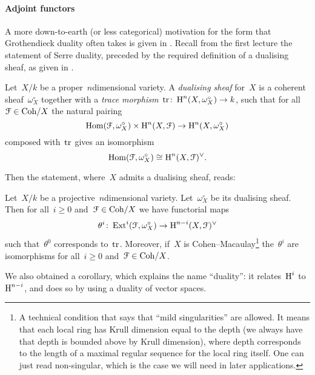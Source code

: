 \paragraph{Adjoint functors}
A more down-to-earth (or less categorical) motivation for the form that Grothendieck duality often takes is given in \cite[chapter 6]{triangulated-categories}. Recall from the first lecture the statement of Serre duality, preceded by the required definition of a dualising sheaf, as given in \cite{hartshorne-algebraic-geometry}.
\begin{definition}
  Let~$X/k$ be a proper~$n$\dash dimensional variety. A \emph{dualising sheaf} for~$X$ is a coherent sheaf~$\omega_X^\circ$ together with a \emph{trace morphism}~$\operatorname{tr}\colon\operatorname{H}^n(X,\omega_X^\circ)\to k$, such that for all~$\mathcal{F}\in\mathrm{Coh}/X$ the natural pairing
  \begin{equation}
    \operatorname{Hom}(\mathcal{F},\omega_X^\circ)\times\operatorname{H}^n(X,\mathcal{F})\to\operatorname{H}^n(X,\omega_X^\circ)
  \end{equation}
  composed with~$\operatorname{tr}$ gives an isomorphism
  \begin{equation}
    \operatorname{Hom}(\mathcal{F},\omega_X^\circ)\cong\operatorname{H}^n(X,\mathcal{F})^\vee.
  \end{equation}
\end{definition}
Then the statement, where~$X$ admits a dualising sheaf, reads:
\begin{theorem}
  Let~$X/k$ be a projective~$n$\dash dimensional variety. Let~$\omega_X^\circ$ be its dualising sheaf. Then for all~$i\geq 0$ and~$\mathcal{F}\in\mathrm{Coh}/X$ we have functorial maps
  \begin{equation}
    \theta^i\colon\operatorname{Ext}^i(\mathcal{F},\omega_X^\circ)\to\operatorname{H}^{n-i}(X,\mathcal{F})^\vee
  \end{equation}
  such that~$\theta^0$ corresponds to~$\operatorname{tr}$. Moreover, if~$X$ is Cohen--Macaulay\footnote{A technical condition that says that ``mild singularities'' are allowed. It means that each local ring has Krull dimension equal to the depth (we always have that depth is bounded above by Krull dimension), where depth corresponds to the length of a maximal regular sequence for the local ring itself. One can just read non-singular, which is the case we will need in later applications.} the~$\theta^i$ are isomorphisms for all~$i\geq 0$ and~$\mathcal{F}\in\mathrm{Coh}/X$.
\end{theorem}
We also obtained a corollary, which explains the name ``duality'': it relates~$\operatorname{H}^i$ to~$\operatorname{H}^{n-i}$, and does so by using a duality of vector spaces.
